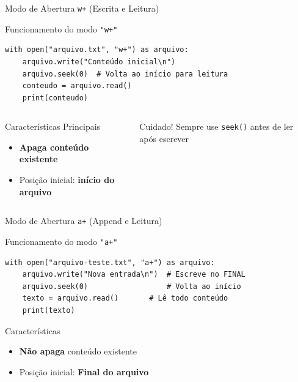 \begin{frame}[fragile]{Modo de Abertura \texttt{w+} (Escrita e Leitura)}
    \begin{block}{Funcionamento do modo \texttt{"w+"}}
        \begin{verbatim}
with open("arquivo.txt", "w+") as arquivo:
    arquivo.write("Conteúdo inicial\n")
    arquivo.seek(0)  # Volta ao início para leitura
    conteudo = arquivo.read()
    print(conteudo)
        \end{verbatim}
    \end{block}

    \begin{columns}[T]
        \begin{column}{0.5\textwidth}
            \begin{alertblock}{Características Principais}
                \begin{itemize}
                    \item \textbf{Apaga conteúdo existente}
                   
                    \item Posição inicial: \textbf{início do arquivo}
                    
                \end{itemize}
            \end{alertblock}
        \end{column}
        
        \begin{column}{0.5\textwidth}
            
            
            \begin{block}{Cuidado!}
                Sempre use \texttt{seek()} antes de ler após escrever
            \end{block}
        \end{column}
    \end{columns}


\end{frame}
\begin{frame}[fragile]{Modo de Abertura \texttt{a+} (Append e Leitura)}

\begin{block}{Funcionamento do modo \texttt{"a+"}}
\begin{verbatim}
with open("arquivo-teste.txt", "a+") as arquivo:
    arquivo.write("Nova entrada\n")  # Escreve no FINAL
    arquivo.seek(0)                  # Volta ao início
    texto = arquivo.read()       # Lê todo conteúdo
    print(texto)
\end{verbatim}
\end{block}

        \begin{alertblock}{Características}
            \begin{itemize}
               \item \textbf{Não apaga} conteúdo existente 
               \item Posição inicial:  \textbf{Final do arquivo}
                
            \end{itemize}
        \end{alertblock}
\end{frame}
